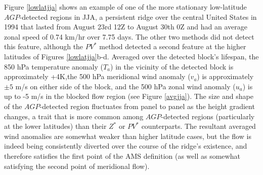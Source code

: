 \documentclass[smallextended]{svjour3}       %
\numberwithin{equation}{section}
\begin{document}
Figure \ref{lowlatjja} shows an example of one of the more stationary low-latitude $AGP$-detected regions in JJA, a persistent ridge over the central United States in 1994 that lasted from August 23rd 12Z to August 30th 0Z and had an average zonal speed of 0.74 km/hr over 7.75 days. The other two methods did not detect this feature, although the $PV^*$ method detected a second feature at the higher latitudes of Figures \ref{lowlatjja}b-d. Averaged over the detected block's lifespan, the 850 hPa temperature anomaly ($T_a$) in the vicinity of the detected block is approximately +4K,the 500 hPa meridional wind anomaly ($v_a$) is approximately $\pm5$ m/s on either side of the block, and the 500 hPa zonal wind anomaly ($u_a$) is up to -5 m/s in the blocked flow region (see Figure \ref{avgjja}). The size and shape of the $AGP$-detected region fluctuates from panel to panel as the height gradient changes, a trait that is more common among $AGP$-detected regions (particularly at the lower latitudes) than their $Z^*$ or $PV^*$ counterparts. The resultant averaged wind anomalies are somewhat weaker than higher latitude cases, but the flow is indeed being consistently diverted over the course of the ridge's existence, and therefore satisfies the first point of the AMS definition (as well as somewhat satisfying the second point of meridional flow).
\end{document}
